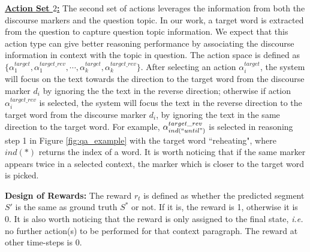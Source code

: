 


 {\bf{\underline{Action Set $2$:}}} The second set of actions leverages the information from both the discourse markers and the question topic. In our work, a target word is extracted from the question to capture question topic information. %
 We expect that this action type can give better reasoning performance by associating the discourse information in context with the topic in question. The action space is defined as $\lbrace\alpha_{1}^{target},\alpha_{1}^{target\_{rev}}, \cdots,\alpha_{k}^{target},\alpha_{k}^{target\_{rev}}\rbrace$. After selecting an action $\alpha_i^{target}$, the system will focus on the text towards the direction to the target word from the discourse marker $d_i$ by ignoring the the text in the reverse direction; otherwise if action $\alpha_i^{target\_{rev}}$ is selected, the system will focus the text in the reverse direction to the target word from the discourse marker $d_i$, by ignoring the text in the same direction to the target word. For example, $\alpha_{ind(``until")}^{target\_{rev}}$ is selected in reasoning step 1 in Figure \ref{fig:qa_example} with the target word ``reheating", where $ind(*)$ returns the index of a word. It is worth noticing that if the same marker appears twice in a  selected context, the marker which is closer to the target word is picked.

 
\textbf{Design of Rewards:} 
The reward $r_t$ is defined as whether the predicted segment $S'$ is the same as ground truth $S^*$ or not.
If it is, the reward is 1, otherwise it is 0. It is also worth noticing that the reward is only assigned to the final state, \emph{i.e.} no further action(s) to be performed for that context paragraph. The reward at other time-steps is 0.

